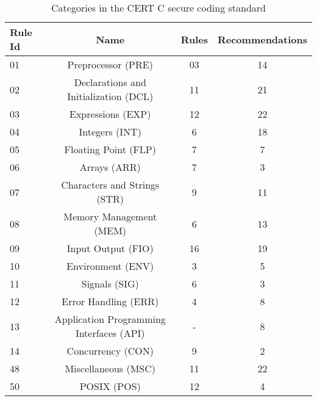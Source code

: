 \begin{table}[h!]
	\centering
	
	\label{tab:table2}
	
	\begin{tabular}{|l|c|c|c|}
		\hline
		\textbf{Rule Id} & \textbf{Name} & \textbf{Rules} & \textbf{Recommendations}\\
		
		\hline
		01 & Preprocessor (PRE) & 03 & 14\\
		\hline
		
		02 & Declarations and Initialization (DCL) & 11 & 21\\
		\hline
		
		03 & Expressions (EXP) & 12 & 22\\
		\hline
		
		04 & Integers (INT) & 6 & 18\\
		\hline
		
		05 & Floating Point (FLP) & 7 & 7\\
		\hline
		
		06 & Arrays (ARR) & 7 & 3\\
		\hline
		
		07 & Characters and Strings (STR) & 9 & 11\\
		\hline
		
		08 & Memory Management (MEM) & 6 & 13\\
		\hline
		
		09 & Input Output (FIO) & 16 & 19\\
		\hline
		
		10 & Environment (ENV) & 3 & 5\\
		\hline
		
		11 & Signals (SIG) & 6 & 3\\
		\hline
		
		12 & Error Handling (ERR) & 4 & 8\\
		\hline
		
		13 & Application Programming Interfaces (API) & - & 8\\
		\hline
		
		14 & Concurrency (CON) & 9 & 2\\
		\hline
		
		48 & Miscellaneous (MSC) & 11 & 22\\
		\hline
		
		50 & POSIX (POS) & 12 & 4\\
		\hline
		
	\end{tabular}
	\caption{Categories in the CERT C secure coding standard}
\end{table}

